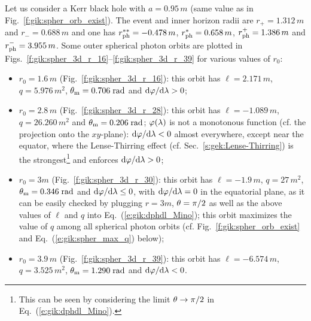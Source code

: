 \begin{example} \label{x:gik:outer_spher}
Let us consider a Kerr black hole with $a=0.95\, m$ (same value as in
Fig.~\ref{f:gik:spher_orb_exist}). The event and inner horizon radii
are $r_+ = 1.312\, m$ and $r_- = 0.688\, m$ and one has
$r_{\rm ph}^{**} = - 0.478\, m$, $r_{\rm ph}^{*} = 0.658\, m$,
$r_{\rm ph}^+ = 1.386\, m$ and $r_{\rm ph}^- = 3.955\, m$.
Some outer spherical photon orbits are plotted in
Figs.~\ref{f:gik:spher_3d_r_16}--\ref{f:gik:spher_3d_r_39}
for various values of $r_0$:
\begin{itemize}
\item $r_0 = 1.6\, m$ (Fig.~\ref{f:gik:spher_3d_r_16}): this orbit
has $\ell = 2.171\, m$, $q=5.976\, m^2$, $\theta_{\rm m} = 0.706\;{\rm rad}$ and $\mathrm{d}\varphi/\mathrm{d}\lambda > 0$;
\item $r_0 = 2.8\, m$ (Fig.~\ref{f:gik:spher_3d_r_28}): this orbit
has $\ell = -1.089\, m$, $q=26.260\, m^2$ and $\theta_{\rm m} = 0.206\;{\rm rad}$;
$\varphi(\lambda)$ is not a monotonous function (cf. the projection onto the $xy$-plane):
$\mathrm{d}\varphi/\mathrm{d}\lambda < 0$ almost everywhere, except
near the equator, where the Lense-Thirring effect (cf. Sec.~\ref{s:gek:Lense-Thirring})
is the strongest\footnote{This can be seen
by considering the limit $\theta\to\pi/2$ in Eq.~(\ref{e:gik:dphdl_Mino}).} and
enforces $\mathrm{d}\varphi/\mathrm{d}\lambda > 0$;
\item $r_0 = 3 m$ (Fig.~\ref{f:gik:spher_3d_r_30}): this orbit
has $\ell = -1.9\, m$, $q=27\, m^2$, $\theta_{\rm m} = 0.346\;{\rm rad}$ and
$\mathrm{d}\varphi/\mathrm{d}\lambda \leq 0$, with $\mathrm{d}\varphi/\mathrm{d}\lambda = 0$ in the equatorial plane,
as it can be easily checked by plugging $r=3m$, $\theta=\pi/2$ as well as
the above values of $\ell$ and $q$ into Eq.~(\ref{e:gik:dphdl_Mino});
this orbit maximizes the value of $q$ among all spherical photon orbits
(cf. Fig.~\ref{f:gik:spher_orb_exist} and Eq.~(\ref{e:gik:spher_max_q}) below);
\item $r_0 = 3.9\, m$ (Fig.~\ref{f:gik:spher_3d_r_39}): this orbit
has $\ell = -6.574\, m$, $q=3.525\, m^2$, $\theta_{\rm m} = 1.290\;{\rm rad}$
and $\mathrm{d}\varphi/\mathrm{d}\lambda < 0$.
\end{itemize}
\end{example}

